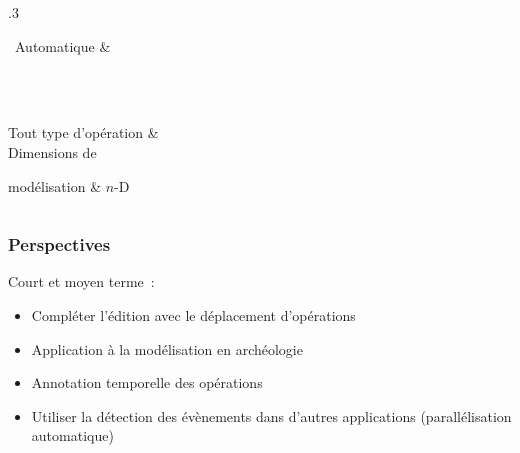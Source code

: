\begin{frame}
\begin{columns}
\begin{column}{.3\textwidth}
\begin{onlyenv}
\begin{tblr}
					\par \textbullet~Automatique & \par ~ \par \cmark \par \cmark \\
					{Tout type} d'opération      & \cmark                         \\
					Dimensions de\par modélisation   & \(n\)-D                        \\
				\end{tblr}
			\end{onlyenv}
		\end{column}
	\end{columns}
\end{frame}

\begin{frame}
	\frametitle{Perspectives}
	Court et moyen terme~:
	\begin{itemize}
		\item<1-> Compléter l'édition avec le déplacement d'opérations
		\item<2-> Application à la modélisation en archéologie
		\item<3-> Annotation temporelle des opérations
	\end{itemize}
	\begin{itemize}
		\item<4> Utiliser la détection des évènements dans d'autres applications (parallélisation automatique)
	\end{itemize}
\end{frame}

